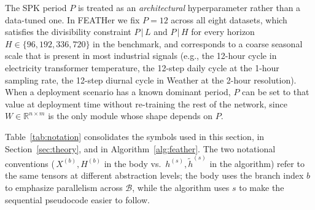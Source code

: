 \documentclass[journal]{IEEEtran}
\theoremstyle{remark}
\begin{document}
The SPK period $P$ is treated as an \emph{architectural} hyperparameter
rather than a data-tuned one. In FEATHer we fix $P{=}12$ across all
eight datasets, which satisfies the divisibility constraint
$P\,|\,L$ and $P\,|\,H$ for every horizon $H \in \{96, 192, 336, 720\}$
in the benchmark, and corresponds to a coarse seasonal scale that is
present in most industrial signals (e.g., the 12-hour cycle in
electricity transformer temperature, the 12-step daily cycle at the
1-hour sampling rate, the 12-step diurnal cycle in Weather at the
2-hour resolution). When a deployment scenario has a known dominant
period, $P$ can be set to that value at deployment time without
re-training the rest of the network, since $W \in \mathbb{R}^{n \times m}$
is the only module whose shape depends on $P$.

Table~\ref{tab:notation} consolidates the symbols used in this
section, in Section~\ref{sec:theory}, and in
Algorithm~\ref{alg:feather}. The two notational conventions
(\,$X^{(b)}, H^{(b)}$ in the body vs.~$h^{(s)}, \widetilde{h}^{(s)}$
in the algorithm) refer to the same tensors at different abstraction
levels; the body uses the branch index $b$ to emphasize parallelism
across $\mathcal{B}$, while the algorithm uses $s$ to make the
sequential pseudocode easier to follow.
\end{document}
